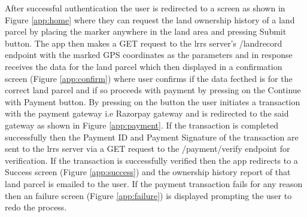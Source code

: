 \documentclass{article}
\begin{document}
        After successful authentication the user is redirected to a screen as shown in Figure \ref{app:home} where they can request the land ownership history of a land parcel by placing the marker anywhere in the land area and pressing Submit button. The app then makes a GET request to the \gls{lrrs} server's /landrecord endpoint with the marked GPS coordinates as the parameters and in response receives the data for the land parcel which then displayed in a confirmation screen (Figure \ref{app:confirm}) where user confirms if the data fecthed is for the correct land parcel and if so proceeds with payment by pressing on the Continue with Payment button. By pressing on the button the user initiates a transaction with the payment gateway i.e Razorpay gateway and is redirected to the said gateway as shown in Figure \ref{app:payment}. If the transaction is completed successfully then the Payment ID and Payment Signature of the transaction are sent to the \gls{lrrs} server via a GET request to the /payment/verify endpoint for verification. If the transaction is successfully verified then the app redirects to a Success screen (Figure \ref{app:success}) and the ownership history report of that land parcel is emailed to the user. If the payment transaction fails for any reason then an failure screen (Figure \ref{app:failure}) is displayed prompting the user to redo the process.
        
\end{document}
